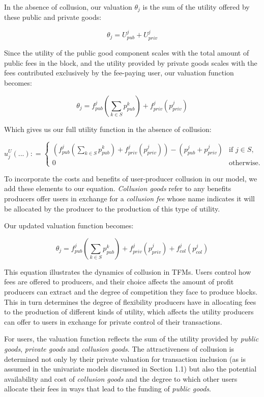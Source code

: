 \documentclass[oneside]{article}   	%
\begin{document}
In the absence of collusion, our valuation $\theta_j$ is the sum of the utility offered by these public and private goods:

$$
\theta_j = U_{pub}^j + U_{priv}^j
$$

Since the utility of the public good component scales with the total amount of public fees in the block, and the utility provided by private goods scales with the fees contributed exclusively by the fee-paying user, our valuation function becomes:

$$
\theta_j = f_{pub}^j\left(\sum_{k \in S} p_{pub}^{k}\right) + f_{priv}^j(p_{priv}^j)
$$

Which gives us our full utility function in the absence of collusion:

\[
u_j^U\left(...\right) : =
\begin{cases}
\left(
        f_{pub}^j
                \left(\sum_{k \in S} p_{pub}^{k}\right)
                + f_{priv}^j(p_{priv}^j)
\right)  -   \left(p_{pub}^j + p_{priv}^j\right) & \text{if } j \in S, \\ 0 & \text{otherwise.}
\end{cases}
\]

To incorporate the costs and benefits of user-producer collusion in our model, we add these elements to our equation. \textit{Collusion goods} refer to any benefits producers offer users in exchange for a \textit{collusion fee} whose name indicates it will be allocated by the producer to the production of this type of utility.

Our updated valuation function becomes:

$$
\theta_j = f_{pub}^j\left(\sum_{k \in S} p_{pub}^{k}\right) + f_{priv}^j(p_{priv}^j) + f_{col}^j(p_{col}^j)
$$

This equation illustrates the dynamics of collusion in TFMs. Users control how fees are offered to producers, and their choice affects the amount of profit producers can extract and the degree of competition they face to produce blocks. This in turn determines the degree of flexibility producers have in allocating fees to the production of different kinds of utility, which affects the utility producers can offer to users in exchange for private control of their transactions.

For users, the valuation function reflects the sum of the utility provided by \textit{public goods}, \textit{private goods} and \textit{collusion goods}. The attractiveness of collusion is determined not only by their private valuation for transaction inclusion (as is assumed in the univariate models discussed in Section 1.1) but also the potential availability and cost of \textit{collusion goods} and the degree to which other users allocate their fees in ways that lead to the funding of \textit{public goods}.
\end{document}
